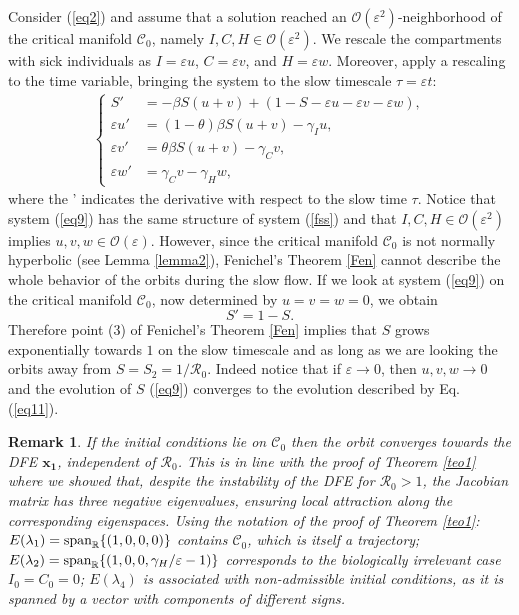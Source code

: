 \documentclass[11pt,reqno]{amsart}
\theoremstyle{boldremark}
\newtheorem{remark}{Remark}
\begin{document}
\noindent Consider (\ref{eq2}) and assume that a solution reached an $\mathcal{O}(\varepsilon^2)$-neighborhood of the critical manifold $\mathcal{C}_0$, namely $I, C,H \in \mathcal{O}(\varepsilon^2)$. We rescale the compartments with sick individuals as $I=\varepsilon u$, $C=\varepsilon v$, and $H=\varepsilon w$. Moreover, apply a rescaling to the time variable, bringing the system to the slow timescale $\tau=\varepsilon t$: 
\begin{align} \label{eq9}
\left\{
\begin{aligned}
    S' &= -\beta S (u+v) + (1-S-\varepsilon u- \varepsilon v- \varepsilon w), \\ 
    \varepsilon u' &= (1-\theta)\beta S (u+v) - \gamma_I u, \\ 
    \varepsilon v' &= \theta \beta S(u+v) - \gamma_C v, \\ 
    \varepsilon w' &= \gamma_C v - \gamma_H w, 
\end{aligned}
\right.
\end{align}
where the ' indicates the derivative with respect to the slow time $\tau$. Notice that system (\ref{eq9}) has the same structure of system (\ref{fss}) and that $I,C,H \in \mathcal{O}(\varepsilon^2)$ implies $u,v,w \in \mathcal{O}(\varepsilon)$. However, since the critical manifold $\mathcal{C}_0$ is not normally hyperbolic (see Lemma \ref{lemma2}), Fenichel's Theorem \ref{Fen} cannot describe the whole behavior of the orbits during the slow flow. If we look at system (\ref{eq9}) on the critical manifold $\mathcal{C}_0$, now determined by $u=v=w=0$, we obtain 
\begin{equation} \label{eq11}
    S' = 1-S. 
\end{equation}
Therefore point (3) of Fenichel's Theorem \ref{Fen} implies that $S$ grows exponentially towards $1$ on the slow timescale and as long as we are looking the orbits away from $S=S_2=1/\mathcal{R}_0$. Indeed notice that if $\varepsilon \to 0$, then $u,v,w \to 0$ and the evolution of $S$ (\ref{eq9}) converges to the evolution described by Eq. (\ref{eq11}).

\begin{remark} \label{rmk2}
    If the initial conditions lie on $\mathcal{C}_0$ then the orbit converges towards the DFE $\mathbf{x_1}$, independent of $\mathcal{R}_0$. This is in line with the proof of Theorem \ref{teo1} where we showed that, despite the instability of the DFE for $\mathcal{R}_0>1$, the Jacobian matrix has three negative eigenvalues, ensuring local attraction along the corresponding eigenspaces. Using the notation of the proof of Theorem \ref{teo1}: $E(\lambda_1)=\textnormal{span}_\mathbb{R}\{(1,0,0,0)\}$ contains $\mathcal{C}_0$, which is itself a trajectory; $E(\lambda_2)=\textnormal{span}_\mathbb{R}\{(1,0,0,\gamma_H/\varepsilon-1)\}$ corresponds to the biologically irrelevant case $I_0=C_0=0$; $E(\lambda_4)$ is associated with non-admissible initial conditions, as it is spanned by a vector with components of different signs. 
\end{remark}
\end{document}
